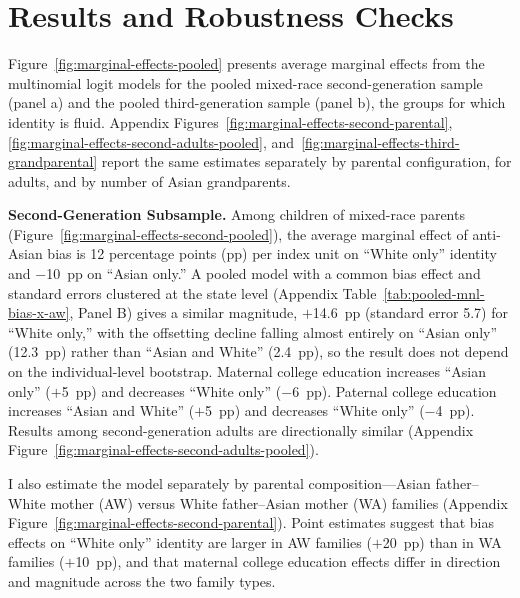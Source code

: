 \section{Results and Robustness Checks}\label{sec:results}

Figure~\ref{fig:marginal-effects-pooled} presents average marginal effects from the multinomial logit models for the pooled mixed-race second-generation sample (panel a) and the pooled third-generation sample (panel b), the groups for which identity is fluid. Appendix Figures~\ref{fig:marginal-effects-second-parental}, \ref{fig:marginal-effects-second-adults-pooled}, and~\ref{fig:marginal-effects-third-grandparental} report the same estimates separately by parental configuration, for adults, and by number of Asian grandparents.

\textbf{Second-Generation Subsample.} Among children of mixed-race parents (Figure~\ref{fig:marginal-effects-second-pooled}), the average marginal effect of anti-Asian bias is 12 percentage points (pp) per index unit on ``White only'' identity and $-$10~pp on ``Asian only.'' A pooled model with a common bias effect and standard errors clustered at the state level (Appendix Table~\ref{tab:pooled-mnl-bias-x-aw}, Panel B) gives a similar magnitude, $+$14.6~pp (standard error 5.7) for ``White only,'' with the offsetting decline falling almost entirely on ``Asian only'' (12.3~pp) rather than ``Asian and White'' (2.4~pp), so the result does not depend on the individual-level bootstrap. Maternal college education increases ``Asian only'' ($+$5~pp) and decreases ``White only'' ($-$6~pp). Paternal college education increases ``Asian and White'' ($+$5~pp) and decreases ``White only'' ($-$4~pp). Results among second-generation adults are directionally similar (Appendix Figure~\ref{fig:marginal-effects-second-adults-pooled}).

I also estimate the model separately by parental composition---Asian father--White mother (AW) versus White father--Asian mother (WA) families (Appendix Figure~\ref{fig:marginal-effects-second-parental}). Point estimates suggest that bias effects on ``White only'' identity are larger in AW families ($+$20~pp) than in WA families ($+$10~pp), and that maternal college education effects differ in direction and magnitude across the two family types.

